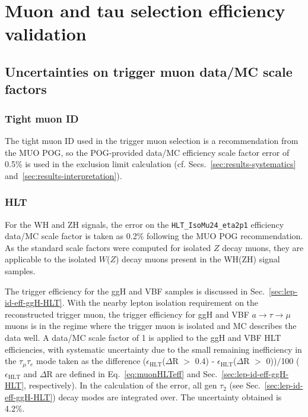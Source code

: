 \chapter{Muon and tau selection efficiency validation\label{sec:lepideff}}
\sloppy
\section{Uncertainties on trigger muon data/MC scale factors\label{sec:lepideff-triggermu}}

\subsection{Tight muon ID\label{lepideff-tightID}}

The tight muon ID used in the trigger muon selection is a recommendation from the MUO POG, so the POG-provided data/MC efficiency scale factor error of 0.5\% is used in the exclusion limit calculation (cf. Secs.~\ref{sec:results-systematics} and~\ref{sec:results-interpretation}).

\subsection{HLT\label{lepideff-HLT}}

For the WH and ZH signals, the error on the \texttt{HLT\_IsoMu24\_eta2p1} efficiency data/MC scale factor is taken as 0.2\% following the MUO POG recommendation.  As the standard scale factors were computed for isolated $Z$ decay muons, they are applicable to the isolated $W$($Z$) decay muons present in the WH(ZH) signal samples.

The trigger efficiency for the ggH and VBF samples is discussed in Sec.~\ref{sec:lep-id-eff-ggH-HLT}.  With the nearby lepton isolation requirement on the reconstructed trigger muon, the trigger efficiency for ggH and VBF $a\rightarrow\tau\to\mu$ muons is in the regime where the trigger muon is isolated and MC describes the data well.  A data/MC scale factor of 1 is applied to the ggH and VBF HLT efficiencies, with systematic uncertainty due to the small remaining inefficiency in the $\tau_{\mu}\tau_{e}$ mode taken as the difference ($\epsilon_{\text{HLT}}$($\Delta$R $>$ 0.4) - $\epsilon_{\text{HLT}}$($\Delta$R $>$ 0))$/$100 ($\epsilon_{\text{HLT}}$ and $\Delta$R are defined in Eq.~\ref{eq:muonHLTeff} and Sec.~\ref{sec:lep-id-eff-ggH-HLT}, respectively).  In the calculation of the error, all gen $\tau_{\text{2}}$ (see Sec.~\ref{sec:lep-id-eff-ggH-HLT}) decay modes are integrated over.  The uncertainty obtained is 4.2\%.

